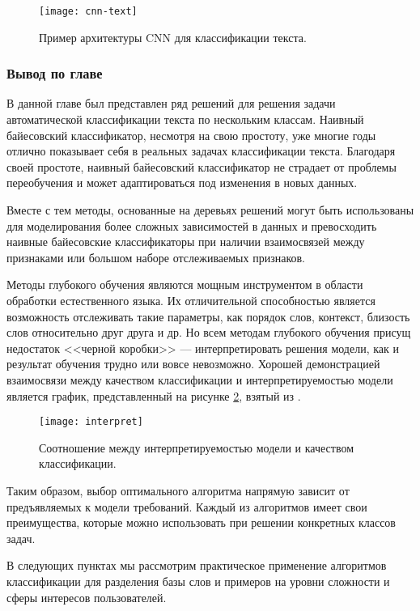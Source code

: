 \begin{figure}[h]
	\centering
	\texttt{[image: cnn-text]}
	\caption{Пример архитектуры CNN для классификации текста.}
	\label{fig:cnn-text}
\end{figure}

\subsubsection{Вывод по главе}
В данной главе был представлен ряд решений для решения задачи автоматической классификации текста по нескольким классам. Наивный байесовский классификатор, несмотря на свою простоту, уже многие годы отлично показывает себя в реальных задачах классификации текста. Благодаря своей простоте, наивный байесовский классификатор не страдает от проблемы переобучения и может адаптироваться под изменения в новых данных. 

Вместе с тем методы, основанные на деревьях решений могут быть использованы для моделирования более сложных зависимостей в данных и превосходить наивные байесовские классификаторы при наличии взаимосвязей между признаками или большом наборе отслеживаемых признаков.

Методы глубокого обучения являются мощным инструментом в области обработки естественного языка. Их отличительной способностью является возможность отслеживать такие параметры, как порядок слов, контекст, близость слов относительно друг друга и др. Но всем методам глубокого обучения присущ недостаток <<черной коробки>> --- интерпретировать решения модели, как и результат обучения трудно или вовсе невозможно. Хорошей демонстрацией взаимосвязи между качеством классификации и интерпретируемостью модели является график, представленный на рисунке \ref{fig:interpret}, взятый из \cite{kowsari2019text}.

\begin{figure}[h]
	\centering
	\texttt{[image: interpret]}
	\caption{Соотношение между интерпретируемостью модели и качеством классификации.}
	\label{fig:interpret}
\end{figure}

Таким образом, выбор оптимального алгоритма напрямую зависит от предъявляемых к модели требований. Каждый из алгоритмов имеет свои преимущества, которые можно использовать при решении конкретных классов задач.

В следующих пунктах мы рассмотрим практическое применение алгоритмов классификации для разделения базы слов и примеров на уровни сложности и сферы интересов пользователей.
